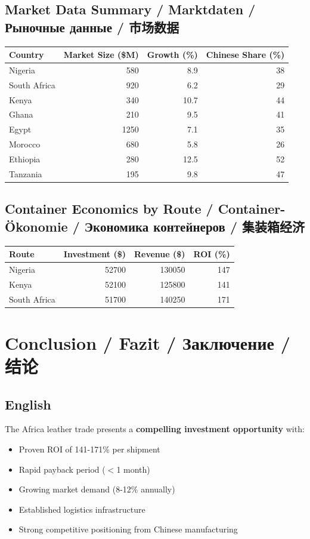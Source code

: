 \documentclass[12pt,a4paper]{article}
\begin{document}
\subsection{Market Data Summary / Marktdaten / Рыночные данные / 市场数据}

\begin{longtable}{lrrr}
\toprule
\textbf{Country} & \textbf{Market Size (\$M)} & \textbf{Growth (\%)} & \textbf{Chinese Share (\%)} \\
\midrule
Nigeria & 580 & 8.9 & 38 \\
South Africa & 920 & 6.2 & 29 \\
Kenya & 340 & 10.7 & 44 \\
Ghana & 210 & 9.5 & 41 \\
Egypt & 1250 & 7.1 & 35 \\
Morocco & 680 & 5.8 & 26 \\
Ethiopia & 280 & 12.5 & 52 \\
Tanzania & 195 & 9.8 & 47 \\
\bottomrule
\end{longtable}

\subsection{Container Economics by Route / Container-Ökonomie / Экономика контейнеров / 集装箱经济}

\begin{longtable}{lrrr}
\toprule
\textbf{Route} & \textbf{Investment (\$)} & \textbf{Revenue (\$)} & \textbf{ROI (\%)} \\
\midrule
Nigeria & 52700 & 130050 & 147 \\
Kenya & 52100 & 125800 & 141 \\
South Africa & 51700 & 140250 & 171 \\
\bottomrule
\end{longtable}


\newpage

\section{Conclusion / Fazit / Заключение / 结论}

\subsection*{English}
The Africa leather trade presents a \textbf{compelling investment opportunity} with:
\begin{itemize}
    \item Proven ROI of 141-171\% per shipment
    \item Rapid payback period ($<$1 month)
    \item Growing market demand (8-12\% annually)
    \item Established logistics infrastructure
    \item Strong competitive positioning from Chinese manufacturing
\end{itemize}
\end{document}

